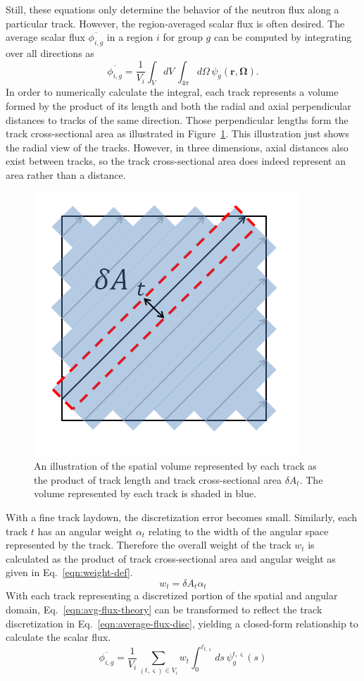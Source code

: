 Still, these equations only determine the behavior of the neutron flux along a particular track. However, the region-averaged scalar flux is often desired. The average scalar flux $\overline{\phi_{i,g}}$ in a region $i$ for group $g$ can be computed by integrating over all directions as
\begin{dmath}
	\overline{\phi_{i,g}} = \frac{1}{V_i}\int_V dV \, \int_{4\pi} d\Omega \, \psi_g(\mathbf{r},\mathbf{\Omega}).
	\label{eqn:avg-flux-theory}
\end{dmath}
In order to numerically calculate the integral, each track represents a volume formed by the product of its length and both the radial and axial perpendicular distances to tracks of the same direction. Those perpendicular lengths form the track cross-sectional area as illustrated in Figure~\ref{fig:track-cross-section}. This illustration just shows the radial view of the tracks. However, in three dimensions, axial distances also exist between tracks, so the track cross-sectional area does indeed represent an area rather than a distance.
\begin{figure}[h!]
	\centering
	\includegraphics[width=0.6\linewidth]{figures/track-cross-sectional-area.PNG}
	\caption[]{An illustration of the spatial volume represented by each track as the product of track length and track cross-sectional area $\delta A_t$. The volume represented by each track is shaded in blue.}
	\label{fig:track-cross-section}
\end{figure}
With a fine track laydown, the discretization error becomes small. Similarly, each track $t$ has an angular weight $\alpha_t$ relating to the width of the angular space represented by the track. Therefore the overall weight of the track $w_t$ is calculated as the product of track cross-sectional area and angular weight as given in Eq.~\ref{eqn:weight-def}.
\begin{equation}
w_{t} = \delta A_{t} \alpha_t
\label{eqn:weight-def}
\end{equation}
With each track representing a discretized portion of the spatial and angular domain, Eq.~\ref{eqn:avg-flux-theory} can be transformed to reflect the track discretization in Eq.~\ref{eqn:average-flux-disc}, yielding a closed-form relationship to calculate the scalar flux.
\begin{dmath}
	\overline{\phi_{i,g}} = \frac{1}{V_i} \sum_{(t,\varsigma) \in V_i} w_{t} \int_{0}^{\ell_{t,\varsigma}} ds \, \psi^{t,\varsigma}_g(s)
	\label{eqn:average-flux-disc}
\end{dmath}


